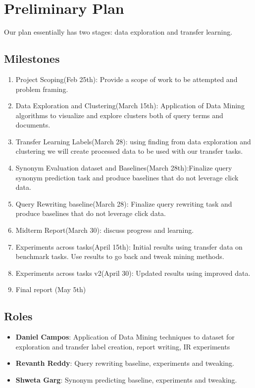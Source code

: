 \section{Preliminary Plan}
Our plan essentially has two stages: data exploration and transfer learning. 
\subsection{Milestones}
\begin{enumerate}
    \item Project Scoping(Feb 25th): Provide a scope of work to be attempted and problem framing.
    \item Data Exploration and Clustering(March 15th): Application of Data Mining algorithms to visualize and explore clusters both of query terms and documents.
    \item Transfer Learning Labels(March 28): using finding from data exploration and clustering we will create processed data to be used with our transfer tasks.
    \item Synonym Evaluation dataset and Baselines(March 28th):Finalize query synonym prediction task and produce baselines that do not leverage click data.
    \item Query Rewriting baseline(March 28): Finalize query rewriting task and produce baselines that do not leverage click data.
    \item Midterm Report(March 30): discuss progress and learning.
    \item Experiments across tasks(April 15th): Initial results using transfer data on benchmark tasks. Use results to go back and tweak mining methods.
    \item Experiments across tasks v2(April 30): Updated results using improved data.
    \item Final report (May 5th)
\end{enumerate}
\subsection{Roles}
\begin{itemize}
  \item \textbf{Daniel Campos}: Application of Data Mining techniques to dataset for exploration and transfer label creation, report writing, IR experiments
  \item \textbf{Revanth Reddy}: Query rewriting baseline, experiments and tweaking.
  \item \textbf{Shweta Garg}: Synonym predicting baseline, experiments and tweaking. 
\end{itemize}
